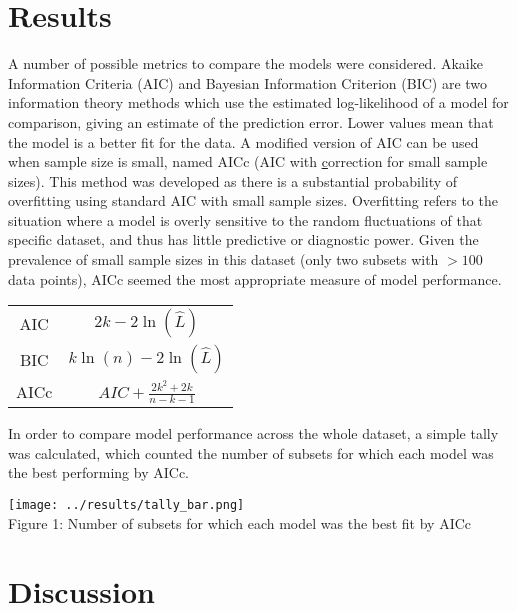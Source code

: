 \documentclass[11pt,a4wide,titlepage]{article}
\begin{document}
\section*{Results}
A number of possible metrics to compare the models were considered. Akaike Information Criteria (AIC) and Bayesian Information Criterion (BIC) are two information theory methods which use the estimated log-likelihood of a model for comparison, giving an estimate of the prediction error. Lower values mean that the model is a better fit for the data. A modified version of AIC can be used when sample size is small, named AICc (AIC with \underline{c}orrection for small sample sizes). This method was developed as there is a substantial probability of overfitting using standard AIC with small sample sizes. Overfitting refers to the situation where a model is overly sensitive to the random fluctuations of that specific dataset, and thus has little predictive or diagnostic power. Given the prevalence of small sample sizes in this dataset (only two subsets with $>100$ data points), AICc seemed the most appropriate measure of model performance.

\begin{center}
\def\arraystretch{1.5}
\begin{tabular}{|c|c|}
	\hline
	AIC & $2k - 2\ln(\hat{L})$\\
	BIC & $k\ln(n) - 2\ln(\hat{L})$\\
	AICc & $AIC + \frac{2k^2 + 2k}{n - k - 1}$\\
	\hline
\end{tabular}
\end{center}

In order to compare model performance across the whole dataset, a simple tally was calculated, which counted the number of subsets for which each model was the best performing by AICc. 


\begin{center}
	\texttt{[image: ../results/tally\_bar.png]}\\
	Figure 1: Number of subsets for which each model was the best fit by AICc
\end{center}



\section*{Discussion}



\end{document}
